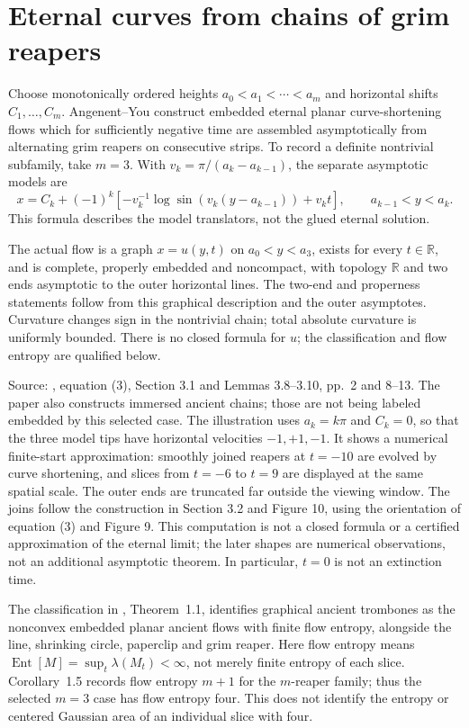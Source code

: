 \chapter{Eternal curves from chains of grim reapers}\label{sec:catalogue-grim-reaper-chains}
\begin{example}\label{ex:catalogue-grim-reaper-chains}
Choose monotonically ordered heights $a_0<a_1<\cdots<a_m$ and horizontal shifts $C_1,\ldots,C_m$. Angenent--You construct embedded eternal planar curve-shortening flows which for sufficiently negative time are assembled asymptotically from alternating grim reapers on consecutive strips. To record a definite nontrivial subfamily, take $m=3$. With $v_k=\pi/(a_k-a_{k-1})$, the separate asymptotic models are
\[
 x=C_k+(-1)^k\left[-v_k^{-1}\log\sin(v_k(y-a_{k-1}))+v_kt\right],
 \qquad a_{k-1}<y<a_k.
\]
This formula describes the model translators, not the glued eternal solution.

The actual flow is a graph $x=u(y,t)$ on $a_0<y<a_3$, exists for every $t\in\mathbb R$, and is complete, properly embedded and noncompact, with topology $\mathbb R$ and two ends asymptotic to the outer horizontal lines. The two-end and properness statements follow from this graphical description and the outer asymptotes. Curvature changes sign in the nontrivial chain; total absolute curvature is uniformly bounded. There is no closed formula for $u$; the classification and flow entropy are qualified below.

Source: \cite{CatAY18}, equation (3), Section 3.1 and Lemmas 3.8--3.10, pp.~2 and 8--13. The paper also constructs immersed ancient chains; those are not being labeled embedded by this selected case. The illustration uses $a_k=k\pi$ and $C_k=0$, so that the three model tips have horizontal velocities $-1,+1,-1$. It shows a numerical finite-start approximation: smoothly joined reapers at $t=-10$ are evolved by curve shortening, and slices from $t=-6$ to $t=9$ are displayed at the same spatial scale. The outer ends are truncated far outside the viewing window. The joins follow the construction in Section 3.2 and Figure 10, using the orientation of equation (3) and Figure 9. This computation is not a closed formula or a certified approximation of the eternal limit; the later shapes are numerical observations, not an additional asymptotic theorem. In particular, $t=0$ is not an extinction time.

The classification in \cite{CatChoiSeoSuZhao2026}, Theorem~1.1, identifies graphical ancient trombones as the nonconvex embedded planar ancient flows with finite flow entropy, alongside the line, shrinking circle, paperclip and grim reaper. Here flow entropy means $\operatorname{Ent}[M]=\sup_t\lambda(M_t)<\infty$, not merely finite entropy of each slice. Corollary~1.5 records flow entropy $m+1$ for the $m$-reaper family; thus the selected $m=3$ case has flow entropy four. This does not identify the entropy or centered Gaussian area of an individual slice with four.
\end{example}

